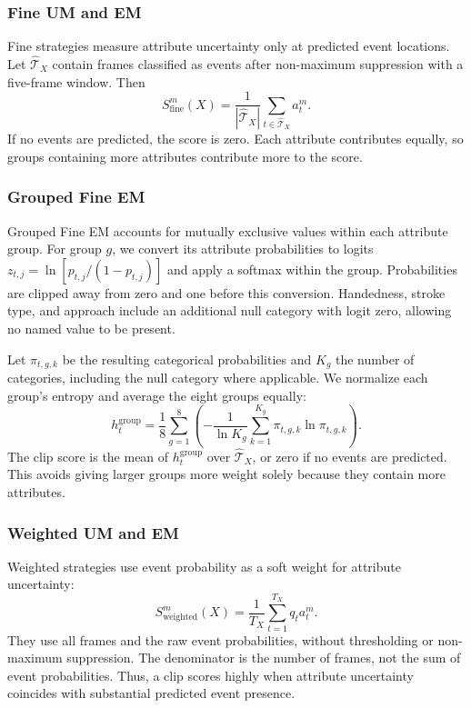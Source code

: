 \subsubsection{Fine UM and EM}
Fine strategies measure attribute uncertainty only at predicted event locations. Let $\hat{\mathcal{T}}_X$ contain frames classified as events after non-maximum suppression with a five-frame window. Then
\begin{equation}
    S_{\mathrm{fine}}^m(X)=\frac{1}{|\hat{\mathcal{T}}_X|}
        \sum_{t\in\hat{\mathcal{T}}_X}a_t^m.
\end{equation}
If no events are predicted, the score is zero. Each attribute contributes equally, so groups containing more attributes contribute more to the score.

\subsubsection{Grouped Fine EM}
Grouped Fine EM accounts for mutually exclusive values within each attribute group. For group $g$, we convert its attribute probabilities to logits $z_{t,j}=\ln[p_{t,j}/(1-p_{t,j})]$ and apply a softmax within the group. Probabilities are clipped away from zero and one before this conversion. Handedness, stroke type, and approach include an additional null category with logit zero, allowing no named value to be present.

Let $\pi_{t,g,k}$ be the resulting categorical probabilities and $K_g$ the number of categories, including the null category where applicable. We normalize each group's entropy and average the eight groups equally:
\begin{equation}
    h_t^{\mathrm{group}}=\frac{1}{8}\sum_{g=1}^{8}
        \left(-\frac{1}{\ln K_g}\sum_{k=1}^{K_g}
        \pi_{t,g,k}\ln\pi_{t,g,k}\right).
\end{equation}
The clip score is the mean of $h_t^{\mathrm{group}}$ over $\hat{\mathcal{T}}_X$, or zero if no events are predicted. This avoids giving larger groups more weight solely because they contain more attributes.

\subsubsection{Weighted UM and EM}
Weighted strategies use event probability as a soft weight for attribute uncertainty:
\begin{equation}
    S_{\mathrm{weighted}}^m(X)=\frac{1}{T_X}\sum_{t=1}^{T_X}q_t a_t^m.
\end{equation}
They use all frames and the raw event probabilities, without thresholding or non-maximum suppression. The denominator is the number of frames, not the sum of event probabilities. Thus, a clip scores highly when attribute uncertainty coincides with substantial predicted event presence.
